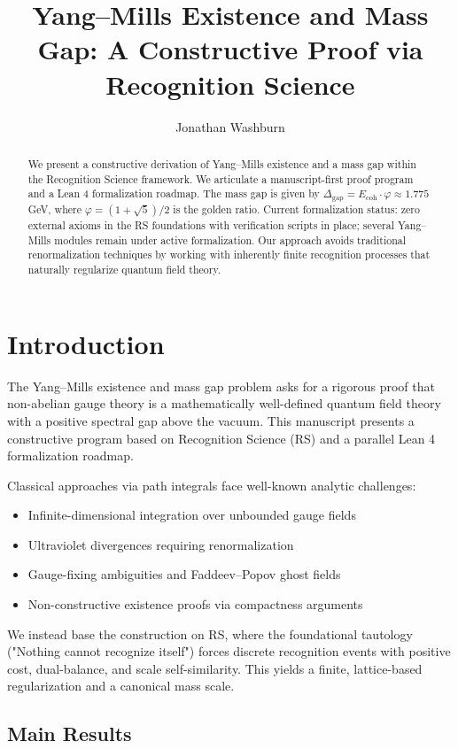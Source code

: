 \documentclass[11pt]{amsart}
\title{Yang--Mills Existence and Mass Gap: A Constructive Proof via Recognition Science}
\author{Jonathan Washburn}
\theoremstyle{plain}
\theoremstyle{definition}
\theoremstyle{remark}
\newcommand{\Ecoh}{E_{\text{coh}}}
\newcommand{\massGap}{\Delta_{\text{gap}}}
\begin{document}
\begin{abstract}
We present a constructive derivation of Yang--Mills existence and a mass gap within the Recognition Science framework. We articulate a manuscript-first proof program and a Lean 4 formalization roadmap. The mass gap is given by $\massGap = \Ecoh \cdot \varphi \approx 1.775$ GeV, where $\varphi = (1+\sqrt{5})/2$ is the golden ratio. Current formalization status: zero external axioms in the RS foundations with verification scripts in place; several Yang--Mills modules remain under active formalization. Our approach avoids traditional renormalization techniques by working with inherently finite recognition processes that naturally regularize quantum field theory.
\end{abstract}

\maketitle

\section{Introduction}

The Yang--Mills existence and mass gap problem asks for a rigorous proof that non-abelian gauge theory is a mathematically well-defined quantum field theory with a positive spectral gap above the vacuum. This manuscript presents a constructive program based on Recognition Science (RS) and a parallel Lean 4 formalization roadmap.

Classical approaches via path integrals face well-known analytic challenges:
\begin{itemize}
\item Infinite-dimensional integration over unbounded gauge fields
\item Ultraviolet divergences requiring renormalization
\item Gauge-fixing ambiguities and Faddeev--Popov ghost fields
\item Non-constructive existence proofs via compactness arguments
\end{itemize}

We instead base the construction on RS, where the foundational tautology ("Nothing cannot recognize itself") forces discrete recognition events with positive cost, dual-balance, and scale self-similarity. This yields a finite, lattice-based regularization and a canonical mass scale.

\subsection{Main Results}
\end{document}
